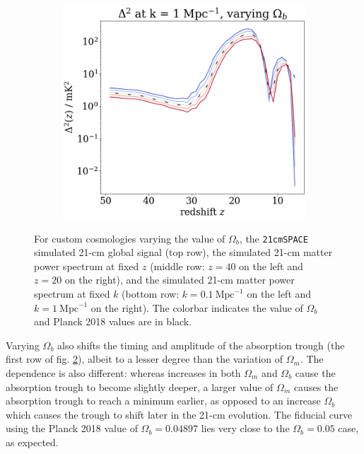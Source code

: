 \documentclass[floats,floatfix,showpacs,amssymb,prd,superscriptaddress,nofootinbib]{revtex4-2} %
\newcommand{\code}{\texttt}
\begin{document}
\begin{figure}[H]
\begin{subfigure}[b]{0.45\textwidth}
     \end{subfigure}
     \hfill
     \begin{subfigure}[b]{0.45\textwidth}
         \centering
         \includegraphics[width=\textwidth]{images/simulation_results/power_spectrum_fixed_k_1_Ob.png}
         \label{fig:power_spectrum_fixed_k_1_Ob}
     \end{subfigure}
        \caption{For custom cosmologies varying the value of $\Omega_b$, the \code{21cmSPACE} simulated 21-cm global signal (top row), the simulated 21-cm matter power spectrum at fixed $z$ (middle row: $z = 40$ on the left and $z = 20$ on the right), and the simulated 21-cm matter power spectrum at fixed $k$ (bottom row: $k = 0.1 ~\text{Mpc}^{-1}$ on the left and $k = 1 ~\text{Mpc}^{-1}$ on the right). The colorbar indicates the value of $\Omega_b$ and Planck 2018 values are in black.}
        \label{fig:simulation_results_Ob}
\end{figure}

Varying $\Omega_b$ also shifts the timing and amplitude of the absorption trough (the first row of fig. \ref{fig:simulation_results_Ob}), albeit to a lesser degree than the variation of $\Omega_m$. The dependence is also different: whereas increases in both $\Omega_m$ and $\Omega_b$ cause the absorption trough to become slightly deeper, a larger value of $\Omega_m$ causes the absorption trough to reach a minimum earlier, as opposed to an increase $\Omega_b$ which causes the trough to shift later in the 21-cm evolution. The fiducial curve using the  Planck 2018 value of $\Omega_b = 0.04897$ lies very close to the $\Omega_b = 0.05$ case, as expected.
\end{document}
